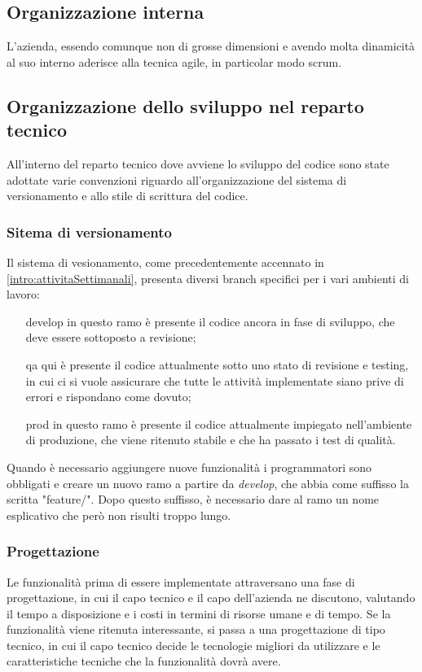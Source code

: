 \subsection{Organizzazione interna}

L'azienda, essendo comunque non di grosse dimensioni e avendo molta dinamicità
al suo interno aderisce alla tecnica \gls{agile}, in particolar modo
\gls{scrum}.

\subsection{Organizzazione dello sviluppo nel reparto tecnico}
\label{intro:OrganizzazioneSviluppoRepartoTecnico}
All'interno del reparto tecnico dove avviene lo sviluppo del codice sono state
adottate varie convenzioni riguardo all'organizzazione del sistema di
versionamento e allo stile di scrittura del codice.

\subsubsection{Sitema di versionamento}
Il sistema di vesionamento, come precedentemente accennato in
\ref{intro:attivitaSettimanali}, presenta diversi branch specifici per i vari
ambienti di lavoro:
\begin{itemize}

\item[develop] in questo ramo è presente il codice ancora in fase di sviluppo,
che deve essere sottoposto a revisione;
\item[qa] qui è presente il codice attualmente sotto uno stato di revisione e
testing, in cui ci si vuole assicurare che tutte le attività implementate siano
prive di errori e rispondano come dovuto;
\item[prod] in questo ramo è presente il codice attualmente impiegato
nell'ambiente di produzione, che viene ritenuto stabile e che ha passato i test
di qualità.
\end{itemize}

Quando è necessario aggiungere nuove funzionalità i programmatori sono
obbligati e creare un nuovo ramo a partire da \textit{develop}, che abbia come
suffisso la scritta "feature/". Dopo questo suffisso, è necessario dare al ramo
un nome esplicativo che però non risulti troppo lungo.

\subsubsection{Progettazione}
Le funzionalità prima di essere implementate attraversano una fase di
progettazione, in cui il capo tecnico e il capo dell'azienda ne discutono,
valutando il tempo a disposizione e i costi in termini di risorse umane e di
tempo. Se la funzionalità viene ritenuta interessante, si passa a una
progettazione di tipo tecnico, in cui il capo tecnico decide le tecnologie
migliori da utilizzare e le caratteristiche tecniche che la funzionalità dovrà
avere.

